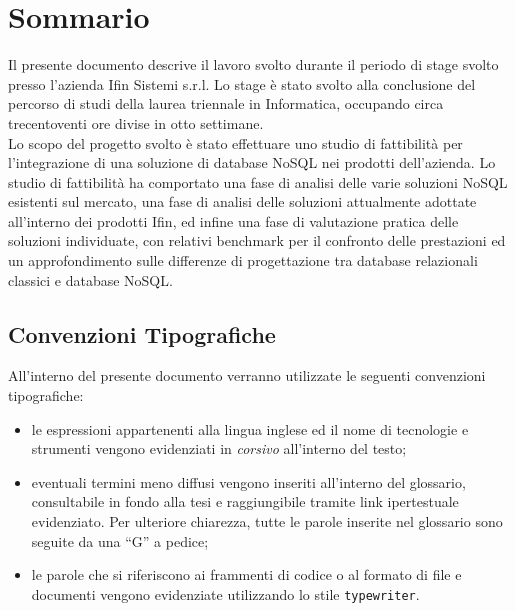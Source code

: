 
\cleardoublepage
{}
{}
\begingroup
\let\clearpage\relax
\let\cleardoublepage\relax
\let\cleardoublepage\relax

\chapter*{Sommario}

Il presente documento descrive il lavoro svolto durante il periodo di stage svolto presso l'azienda Ifin Sistemi s.r.l. Lo stage è stato svolto alla conclusione del percorso di studi della laurea triennale in Informatica, occupando circa trecentoventi ore divise in otto settimane.\\
Lo scopo del progetto svolto è stato effettuare uno studio di fattibilità per l’integrazione di una soluzione di database NoSQL nei prodotti dell'azienda. Lo studio di fattibilità ha comportato una fase di analisi delle varie soluzioni NoSQL esistenti sul mercato, una fase di analisi delle soluzioni attualmente adottate all'interno dei prodotti Ifin, ed infine una fase di valutazione pratica delle soluzioni individuate, con relativi benchmark per il confronto delle prestazioni ed un approfondimento sulle differenze di progettazione tra database relazionali classici e database NoSQL.

\vfill

\section*{Convenzioni Tipografiche}

All'interno del presente documento verranno utilizzate le seguenti convenzioni tipografiche:
\begin{itemize}
    \item le espressioni appartenenti alla lingua inglese ed il nome di tecnologie e strumenti vengono evidenziati in \textit{corsivo} all'interno del testo;
    \item eventuali termini meno diffusi vengono inseriti all'interno del glossario, consultabile in fondo alla tesi e raggiungibile tramite link ipertestuale \textcolor{bluelink}{evidenziato}. Per ulteriore chiarezza, tutte le parole inserite nel glossario sono seguite da una ``G'' a pedice;
    \item le parole che si riferiscono ai frammenti di codice o al formato di file e documenti vengono evidenziate utilizzando lo stile \texttt{typewriter}.
\end{itemize}


%
%

\endgroup			

\vfill

